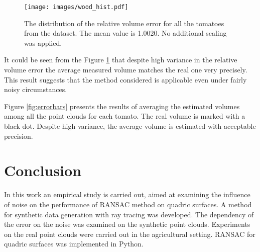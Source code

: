 \begin{figure}[!htb]
  \centering
      \texttt{[image: images/wood\_hist.pdf]}
      \caption{The distribution of the relative volume error for all the tomatoes from the dataset. The mean value is 1.0020. No additional scaling was applied.}
      \label{fig:wood_hist}
\end{figure}

It could be seen from the Figure \ref{fig:wood_hist} that despite high variance in the relative volume error the average measured volume matches the real one very precisely.
This result suggests that the method considered is applicable even under fairly noisy circumstances.

Figure \ref{fig:errorbars} presents the results of averaging the estimated volumes among all the point clouds for each tomato.
The real volume is marked with a black dot.
Despite high variance, the average volume is estimated with acceptable precision.




\section{Conclusion}
\label{sec_conclusion}


In this work an empirical study is carried out, aimed at examining the influence of noise on the performance of RANSAC method on quadric surfaces.
A method for synthetic data generation with ray tracing was developed.
The dependency of the error on the noise was examined on the synthetic point clouds.
Experiments on the real point clouds were carried out in the agricultural setting.
RANSAC for quadric surfaces was implemented in Python.

